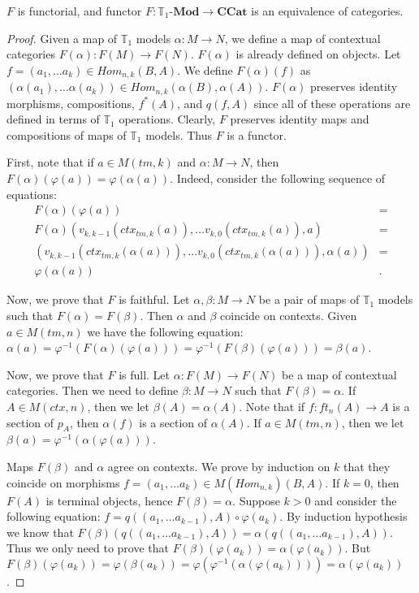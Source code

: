 \documentclass[reqno]{amsart}
\theoremstyle{definition}
\theoremstyle{remark}
\newcommand{\cat}[1]{\mathbf{#1}}
\newcommand{\ccat}{\cat{CCat}}
\newcommand{\Mod}[1]{#1\text{-}\cat{Mod}}
\numberwithin{figure}{section}
\begin{document}
\begin{prop}[T1-CCat]
$F$ is functorial, and functor $F : \Mod{\mathbb{T}_1} \to \ccat$ is an equivalence of categories.
\end{prop}
\begin{proof}
Given a map of $\mathbb{T}_1$ models $\alpha : M \to N$, we define a map of contextual categories $F(\alpha) : F(M) \to F(N)$.
$F(\alpha)$ is already defined on objects.
Let $f = (a_1, \ldots a_k) \in Hom_{n,k}(B,A)$.
We define $F(\alpha)(f)$ as $(\alpha(a_1), \ldots \alpha(a_k)) \in Hom_{n,k}(\alpha(B), \alpha(A))$.
$F(\alpha)$ preserves identity morphisms, compositions, $f^*(A)$, and $q(f,A)$ since all of these operations are defined in terms of $\mathbb{T}_1$ operations.
Clearly, $F$ preserves identity maps and compositions of maps of $\mathbb{T}_1$ models.
Thus $F$ is a functor.

First, note that if $a \in M(tm,k)$ and $\alpha : M \to N$, then $F(\alpha)(\varphi(a)) = \varphi(\alpha(a))$.
Indeed, consider the following sequence of equations:
\begin{align*}
F(\alpha)(\varphi(a)) & = \\
F(\alpha)(v_{k,k-1}(ctx_{tm,k}(a)), \ldots v_{k,0}(ctx_{tm,k}(a)), a) & = \\
(v_{k,k-1}(ctx_{tm,k}(\alpha(a))), \ldots v_{k,0}(ctx_{tm,k}(\alpha(a))), \alpha(a)) & = \\
\varphi(\alpha(a)) & .
\end{align*}

Now, we prove that $F$ is faithful.
Let $\alpha,\beta : M \to N$ be a pair of maps of $\mathbb{T}_1$ models such that $F(\alpha) = F(\beta)$.
Then $\alpha$ and $\beta$ coincide on contexts.
Given $a \in M(tm,n)$ we have the following equation: $\alpha(a) = \varphi^{-1}(F(\alpha)(\varphi(a))) = \varphi^{-1}(F(\beta)(\varphi(a))) = \beta(a)$.

Now, we prove that $F$ is full.
Let $\alpha : F(M) \to F(N)$ be a map of contextual categories.
Then we need to define $\beta : M \to N$ such that $F(\beta) = \alpha$.
If $A \in M(ctx,n)$, then we let $\beta(A) = \alpha(A)$.
Note that if $f : ft_n(A) \to A$ is a section of $p_A$, then $\alpha(f)$ is a section of $\alpha(A)$.
If $a \in M(tm,n)$, then we let $\beta(a) = \varphi^{-1}(\alpha(\varphi(a)))$.

Maps $F(\beta)$ and $\alpha$ agree on contexts.
We prove by induction on $k$ that they coincide on morphisms $f = (a_1, \ldots a_k) \in M(Hom_{n,k})(B,A)$.
If $k = 0$, then $F(A)$ is terminal objects, hence $F(\beta) = \alpha$.
Suppose $k > 0$ and consider the following equation: $f = q((a_1, \ldots a_{k-1}), A) \circ \varphi(a_k)$.
By induction hypothesis we know that $F(\beta)(q((a_1, \ldots a_{k-1}), A)) = \alpha(q((a_1, \ldots a_{k-1}), A))$.
Thus we only need to prove that $F(\beta)(\varphi(a_k)) = \alpha(\varphi(a_k))$.
But $F(\beta)(\varphi(a_k)) = \varphi(\beta(a_k)) = \varphi(\varphi^{-1}(\alpha(\varphi(a_k)))) = \alpha(\varphi(a_k))$.


\end{proof}
\end{document}
